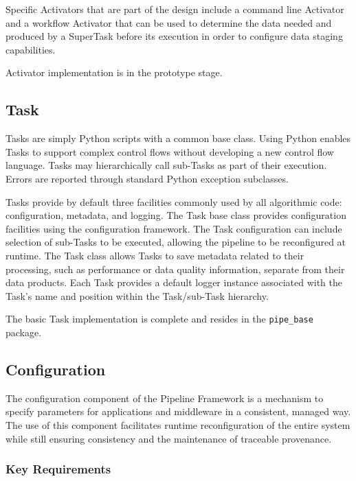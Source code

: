 \documentclass[DM,toc]{lsstdoc}
\begin{document}
Specific Activators that are part of the design include a command line
Activator and a workflow Activator that can be used to determine the data
needed and produced by a SuperTask before its execution in order to configure
data staging capabilities.

Activator implementation is in the prototype stage.

\subsection{Task}\label{task}

Tasks are simply Python scripts with a common base class. Using Python enables
Tasks to support complex control flows without developing a new control flow
language. Tasks may hierarchically call sub-Tasks as part of their execution.
Errors are reported through standard Python exception subclasses.

Tasks provide by default three facilities commonly used by all algorithmic
code: configuration, metadata, and logging.  The Task base class provides
configuration facilities using the configuration framework. The Task
configuration can include selection of sub-Tasks to be executed, allowing the
pipeline to be reconfigured at runtime.  The Task class allows Tasks to save
metadata related to their processing, such as performance or data quality
information, separate from their data products.  Each Task provides a default
logger instance associated with the Task's name and position within the
Task/sub-Task hierarchy.

The basic Task implementation is complete and resides in the
\texttt{pipe\_base} package.

\subsection{Configuration}\label{configuration}

The configuration component of the Pipeline Framework is a mechanism to
specify parameters for applications and middleware in a consistent,
managed way. The use of this component facilitates runtime
reconfiguration of the entire system while still ensuring consistency
and the maintenance of traceable provenance.

\subsubsection{Key Requirements}\label{configuration-reqs}
\end{document}
